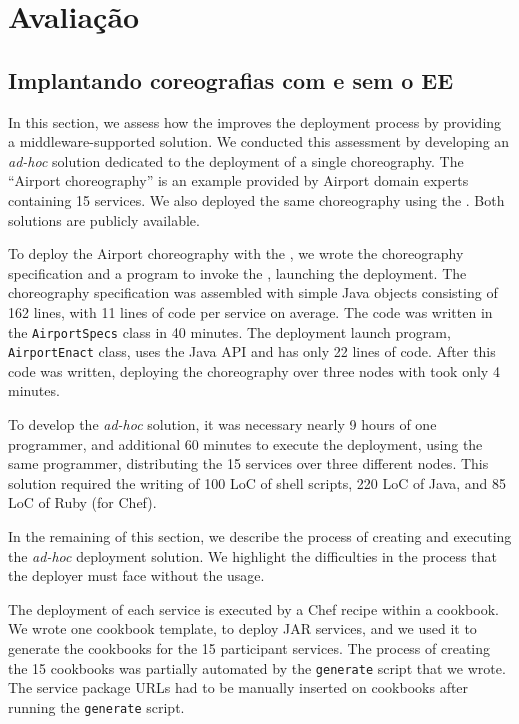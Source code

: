 \chapter{Avaliação}
\label{cap:avaliacao}


\section{Implantando coreografias com e sem o EE}

In this section, we assess how
the \choreos \ee improves the deployment process by providing a middleware-supported solution.
We conducted this assessment by developing an \emph{ad-hoc} solution
dedicated to the deployment of a single choreography.
The ``Airport choreography'' is an example provided by Airport domain
experts~\cite{Choreos2012D6.2} containing 15 services.
We also deployed the same choreography using the \ee.
Both solutions are publicly available.

To deploy the Airport choreography with the \ee, we wrote the choreography
specification and a program to invoke the \ee, launching the deployment.
The choreography specification was assembled with simple Java objects consisting of 162 lines,
with 11 lines of code per service on average.
The code was written in the \texttt{AirportSpecs} class in 40 minutes.
The deployment launch program, \texttt{AirportEnact} class, uses the \ee Java API and has only 22 lines of code.
After this code was written, deploying the choreography over three nodes with \ee
took only 4 minutes.

To develop the \emph{ad-hoc} solution, it was necessary nearly 9 hours of one programmer,
and additional 60 minutes to execute the deployment, using the same programmer, 
distributing the 15 services over three different nodes. 
This solution required the writing of
100 LoC of shell scripts, 220 LoC of Java, and 85 LoC of Ruby (for Chef). 

In the remaining of this section, we describe the process of creating and executing
the \emph{ad-hoc} deployment solution. We highlight the difficulties in the process
that the deployer must face without the \ee usage.

The deployment of each service is executed by a Chef recipe within a cookbook.
We wrote one cookbook template, to deploy JAR services,
and we used it to generate the cookbooks for the 15 participant services.
The process of creating the 15 cookbooks was partially automated by
the \texttt{generate} script that we wrote.
The service package URLs had to be manually inserted on cookbooks
after running the \texttt{generate} script.

